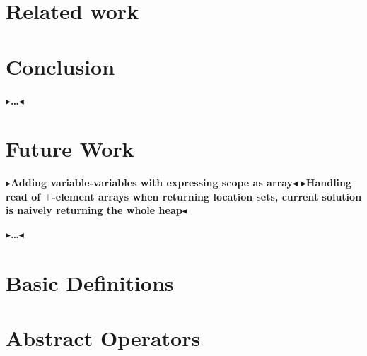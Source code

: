 \documentclass[twoside,11pt,openright]{report}
\theoremstyle{definition}
\newcommand{\todo}[1]{{\color[rgb]{.5,0,0}\textbf{$\blacktriangleright$#1$\blacktriangleleft$}}}
\begin{document}
\chapter{Related work}
\label{ch:relatedWork}


\chapter{Conclusion}
\label{ch:conclusion}

\todo{\dots}

\chapter{Future Work}
\label{ch:futureWork}
\todo{Adding variable-variables with expressing scope as array}
\todo{Handling read of $\top$-element arrays when returning location sets, current solution is naively returning the whole heap}

\todo{\dots}

\newpage
\appendix
\chapter{Basic Definitions}
\label{app:lattice}


%

%

\chapter{Abstract Operators}
\label{app:abstract_operators}


\end{document}
